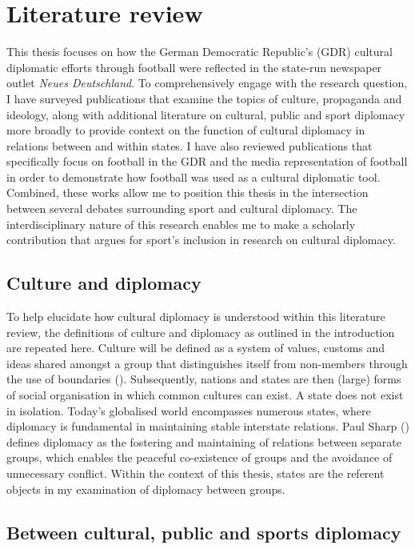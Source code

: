 \chapter{Literature review\label{cha:litreivew}}

This thesis focuses on how the German Democratic Republic’s (GDR) cultural diplomatic efforts through football were reflected in the state-run newspaper outlet \textit{Neues Deutschland}. To comprehensively engage with the research question, I have surveyed publications that examine the topics of culture, propaganda and ideology, along with additional literature on cultural, public and sport diplomacy more broadly to provide context on the function of cultural diplomacy in relations between and within states. I have also reviewed publications that specifically focus on football in the GDR and the media representation of football in order to demonstrate how football was used as a cultural diplomatic tool. Combined, these works allow me to position this thesis in the intersection between several debates surrounding sport and cultural diplomacy. The interdisciplinary nature of this research enables me to make a scholarly contribution that argues for sport’s inclusion in research on cultural diplomacy.

\section{Culture and diplomacy}

To help elucidate how cultural diplomacy is understood within this literature review, the definitions of culture and diplomacy as outlined in the introduction are repeated here. Culture will be defined as a system of values, customs and ideas shared amongst a group that distinguishes itself from non-members through the use of boundaries (\cite{cohen1995}). Subsequently, nations and states are then (large) forms of social organisation in which common cultures can exist. A state does not exist in isolation. Today’s globalised world encompasses numerous states, where diplomacy is fundamental in maintaining stable interstate relations. Paul Sharp (\citeyear{sharp2003}) defines diplomacy as the fostering and maintaining of relations between separate groups, which enables the peaceful co-existence of groups and the avoidance of unnecessary conflict. Within the context of this thesis, states are the referent objects in my examination of diplomacy between groups.

\section{Between cultural, public and sports diplomacy}

